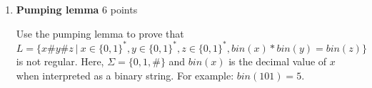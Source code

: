 \documentclass[11pt]{article}
\begin{document}
\begin{enumerate}
\begin{answer}
\begin{center}
  \end{center}

\end{answer}

(3 points) 

Using an alphabet ($\Sigma$) of only lowercase vowels ('a', 'e', 'i', 'o', 'u'), give a regular expression representing all strings where 'a's cannot be the first or last letter. 

\begin{answer}
  
  So we need to start with other letters and end with other letters except $a$. So for the first letter we have $(e \cup i \cup o \cup u)$, the middle can be any letter so we have $(a \cup e \cup i \cup o \cup u)^*$ and the last letter is non-a as well which is, $(e \cup i \cup o \cup u)$ so putting it together we have, 
  \[
    (e \cup i \cup o \cup u)(a \cup e \cup i \cup o \cup u)^*(e \cup i \cup o \cup u)
  \]

  Now note that this implies our string is length 2 or above. So to include length 1 strings we have, 

  \[
    (e \cup i \cup o \cup u) \cup  (e \cup i \cup o \cup u)(a \cup e \cup i \cup o \cup u)^*(e \cup i \cup o \cup u)
  \]
\end{answer}


\item \textbf{Pumping lemma} 6 points

Use the pumping lemma to prove that $L =\{x\#y\#z \: | \: x \in \{0, 1\}^*, y \in \{0, 1\}^*, z \in \{0, 1\}^*, bin(x) * bin(y) = bin(z)\}$ is not regular. Here, $\Sigma = \{0, 1, \#\}$ and $bin(x)$ is the decimal value of $x$ when interpreted as a binary string. For example: $bin(101) = 5$. 


\end{enumerate}
\end{document}
